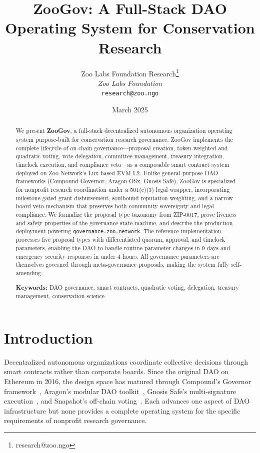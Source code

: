 \documentclass[11pt,letterpaper]{article}
\title{\textbf{ZooGov: A Full-Stack DAO Operating System for Conservation Research}}
\author{
Zoo Labs Foundation Research\thanks{research@zoo.ngo}\\
\textit{Zoo Labs Foundation}\\
\texttt{research@zoo.ngo}
}
\date{March 2025}
\begin{document}
\zoocoverpage

\begin{abstract}
We present \textbf{ZooGov}, a full-stack decentralized autonomous organization operating system purpose-built for conservation research governance. ZooGov implements the complete lifecycle of on-chain governance---proposal creation, token-weighted and quadratic voting, vote delegation, committee management, treasury integration, timelock execution, and compliance veto---as a composable smart contract system deployed on Zoo Network's Lux-based EVM L2. Unlike general-purpose DAO frameworks (Compound Governor, Aragon OSx, Gnosis Safe), ZooGov is specialized for nonprofit research coordination under a 501(c)(3) legal wrapper, incorporating milestone-gated grant disbursement, soulbound reputation weighting, and a narrow board veto mechanism that preserves both community sovereignty and legal compliance. We formalize the proposal type taxonomy from ZIP-0017, prove liveness and safety properties of the governance state machine, and describe the production deployment powering \texttt{governance.zoo.network}. The reference implementation processes five proposal types with differentiated quorum, approval, and timelock parameters, enabling the DAO to handle routine parameter changes in 9 days and emergency security responses in under 4 hours. All governance parameters are themselves governed through meta-governance proposals, making the system fully self-amending.

\medskip
\noindent\textbf{Keywords:} DAO governance, smart contracts, quadratic voting, delegation, treasury management, conservation science
\end{abstract}

\newpage
\tableofcontents
\newpage

\section{Introduction}
\label{sec:intro}

Decentralized autonomous organizations coordinate collective decisions through smart contracts rather than corporate boards. Since the original DAO on Ethereum in 2016, the design space has matured through Compound's Governor framework~\cite{compound2020governance}, Aragon's modular DAO toolkit~\cite{aragon2023osx}, Gnosis Safe's multi-signature execution~\cite{gnosis2021safe}, and Snapshot's off-chain voting~\cite{snapshot2021}. Each advances one aspect of DAO infrastructure but none provides a complete operating system for the specific requirements of nonprofit research governance.
\end{document}
